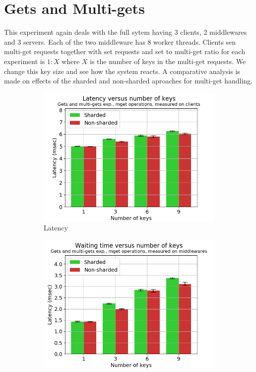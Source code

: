 \documentclass[11pt,a4paper]{article}
\begin{document}
\section{Gets and Multi-gets} \label{sec:gmg}
This experiment again deals with the full sytem having 3 clients, 2 middlewares and 3 servers. Each of the two middleware has 8 worker threads. Clients sen multi-get requests together with set requests and set to multi-get ratio for each experiment is $1:X$ where $X$ is the number of keys in the multi-get requests. We change this key size and see how the system reacts. A comparative analysis is made on effects of the sharded and non-sharded aproaches for multi-get handling.
\begin{figure}[h]
\begin{subfigure}{.5\textwidth}
  \centering
  \includegraphics[width=1.0\linewidth ,trim={5px 0px 20px 0px},clip]{img/plot/gmg-mget-lat_cli.png}
  \caption{Latency}
  \label{fig:gmg-mget-lat_cli}
\end{subfigure}%
\begin{subfigure}{.5\textwidth}
  \centering
  \includegraphics[width=1.0\linewidth ,trim={5px 0px 20px 0px},clip]{img/plot/gmg-mget-wtime_mw.png}

\end{subfigure}
\end{figure}
\end{document}
